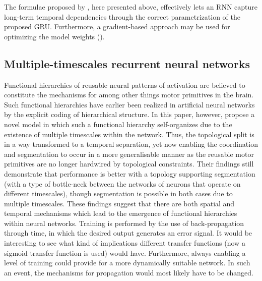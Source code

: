 The formulae proposed by \cite{Cho2014}, here presented above, effectively lets an RNN capture long-term temporal dependencies through the correct parametrization of the proposed GRU. Furthermore, a gradient-based approach may be used for optimizing the model weights (\cite{Cho2014}).


\subsection{Multiple-timescales recurrent neural networks}

Functional hierarchies of reusable neural patterns of activation are believed to constitute the mechanisms for among other things motor primitives in the brain. Such functional hierarchies have earlier been realized in artificial neural networks by the explicit coding of hierarchical structure. In this paper, however, \cite{Yamashita2008} propose a novel model in which such a functional hierarchy self-organizes due to the existence of multiple timescales within the network. Thus, the topological split is in a way transformed to a temporal separation, yet now enabling the coordination and segmentation to occur in a more generalisable manner as the reusable motor primitives are no longer hardwired by topological constraints. Their findings still demonstrate that performance is better with a topology supporting segmentation (with a type of bottle-neck between the networks of neurons that operate on different timescales), though segmentation is possible in both cases due to multiple timescales. These findings suggest that there are both spatial and temporal mechanisms which lead to the emergence of functional hierarchies within neural networks. Training is performed by the use of back-propagation through time, in which the desired output generates an error signal. It would be interesting to see what kind of implications different transfer functions (now a sigmoid transfer function is used) would have. Furthermore, always enabling a level of training could provide for a more dynamically suitable network. In such an event, the mechanisms for propagation would most likely have to be changed.

